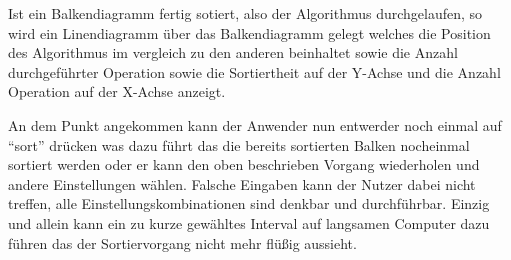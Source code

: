Ist ein Balkendiagramm fertig sotiert, also der Algorithmus durchgelaufen, so wird ein Linendiagramm über das Balkendiagramm gelegt welches die Position
des Algorithmus im vergleich zu den anderen beinhaltet sowie die Anzahl durchgeführter Operation sowie die Sortiertheit auf der Y-Achse und
die Anzahl Operation auf der X-Achse anzeigt.
 
An dem Punkt angekommen kann der Anwender nun entwerder noch einmal auf "`sort"' drücken was dazu führt das die bereits sortierten Balken
nocheinmal sortiert werden oder er kann den oben beschrieben Vorgang wiederholen und andere Einstellungen wählen.
Falsche Eingaben kann der Nutzer dabei nicht treffen, alle Einstellungskombinationen sind denkbar und durchführbar. Einzig und allein
kann ein zu kurze gewähltes Interval auf langsamen Computer dazu führen das der Sortiervorgang nicht mehr flüßig aussieht.


